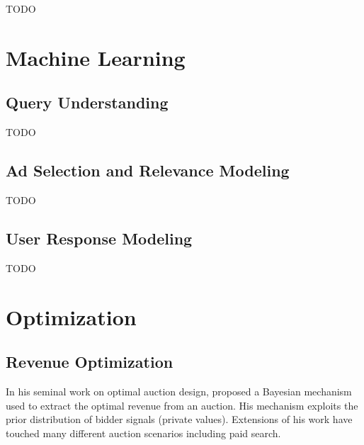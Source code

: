 \documentclass[prodmode,acmtist]{acmsmall} %
\begin{document}
TODO



\section{Machine Learning} %
\label{sec:machine_learning}

\subsection{Query Understanding} %
\label{sub:query_understanding}

TODO



\subsection{Ad Selection and Relevance Modeling} %
\label{sub:ad_selection_and_relevance_modeling}

TODO


\subsection{User Response Modeling} %
\label{sub:user_response_modeling}

TODO


\section{Optimization}
\label{sec:optimization}

\subsection{Revenue Optimization} %
\label{sub:revenue_optimization}

In his seminal work on optimal auction design,  proposed a Bayesian mechanism used to extract the optimal revenue from an auction.
His mechanism exploits the prior distribution of bidder signals (private values).
Extensions of his work have touched many different auction scenarios including paid search. 
\end{document}
